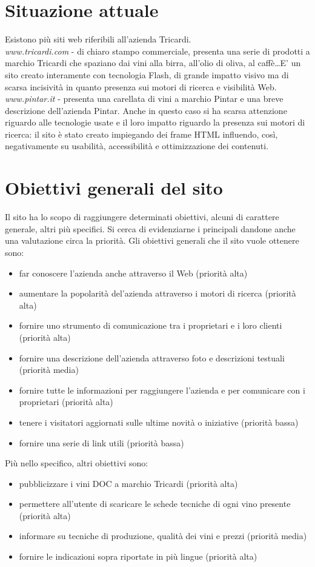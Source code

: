 \documentclass[a4paper]{report}	%
\begin{document}
\section{Situazione attuale}
Esistono più siti web riferibili all'azienda Tricardi.\\ 
\textsl{www.tricardi.com} - di chiaro stampo commerciale, presenta una serie di prodotti a marchio Tricardi che spaziano dai vini alla birra, all'olio di oliva, al caffè\ldots E' un sito creato interamente con tecnologia Flash, di grande impatto visivo ma di scarsa incisività in quanto presenza sui motori di ricerca e visibilità Web.
\textsl{www.pintar.it} - presenta una carellata di vini a marchio Pintar e una breve descrizione dell'azienda Pintar. Anche in questo caso si ha scarsa attenzione riguardo alle tecnologie usate e il loro impatto riguardo la presenza sui motori di ricerca: il sito è stato creato impiegando dei frame HTML influendo, così, negativamente su usabilità, accessibilità e ottimizzazione dei contenuti. 

\section{Obiettivi generali del sito}
Il sito ha lo scopo di raggiungere determinati obiettivi, alcuni di carattere generale, altri più specifici. Si cerca di evidenziarne i principali dandone anche una valutazione circa la priorità. Gli obiettivi generali che il sito vuole ottenere sono:
\begin{itemize}
\item far conoscere l'azienda anche attraverso il Web	(priorità alta)
\item aumentare la popolarità del'azienda attraverso i motori di ricerca	(priorità alta)
\item fornire uno strumento di comunicazione tra i proprietari e i loro clienti 	(priorità alta)
\item fornire una descrizione dell'azienda attraverso foto e descrizioni testuali	(priorità media)
\item fornire tutte le informazioni per raggiungere l'azienda e per comunicare con i proprietari 	(priorità alta)
\item tenere i visitatori aggiornati sulle ultime novità o iniziative 	(priorità bassa)
\item fornire una serie di link utili 	(priorità bassa)
\end{itemize}
Più nello specifico, altri obiettivi sono:
\begin{itemize}
\item pubblicizzare i vini DOC a marchio Tricardi	(priorità alta)
\item permettere all'utente di scaricare le schede tecniche di ogni vino presente	(priorità alta)
\item informare su tecniche di produzione, qualità dei vini e prezzi	(priorità media)
\item fornire le indicazioni sopra riportate in più lingue	(priorità alta)
\end{itemize}
\end{document}
